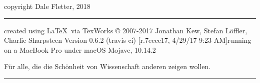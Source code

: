 
        copyright Dale Fletter, 2018\\
        \vspace{1in}
               
       \noindent\rule{8cm}{0.4pt}

        created using \LaTeX\  via TexWorks
        © 2007-2017 Jonathan Kew, Stefan Löffler, Charlie Sharpsteen
       Version 0.6.2 (travis-ci) [r.7ecce17, 4/29/17 9:23 AM]running on a MacBook Pro under macOS Mojave, 10.14.2
       \vspace{1in}
       
       
       Für alle, die die Schönheit von Wissenschaft anderen zeigen wollen.
       
       
       
       
       \noindent\rule{8cm}{0.4pt}
	